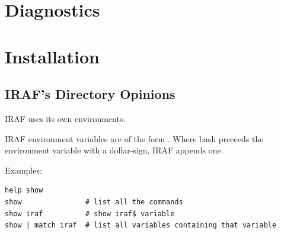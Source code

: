 
\renewcommand{\footerfilename}{Diagnostics.tex}

\section{Diagnostics}  \label{sec:Diagnostics}

\section{Installation}

\subsection{IRAF's Directory Opinions}

IRAF uses its own environments.

IRAF environment variables are of the form . Where bash
preceeds the environment variable with a dollar-sign, IRAF appends one.

Examples:

\begingroup \fontsize{10pt}{10pt}
\selectfont
\begin{verbatim} 
help show
show               # list all the commands
show iraf          # show iraf$ variable
show | match iraf  # list all variables containing that variable
\end{verbatim}
\endgroup

